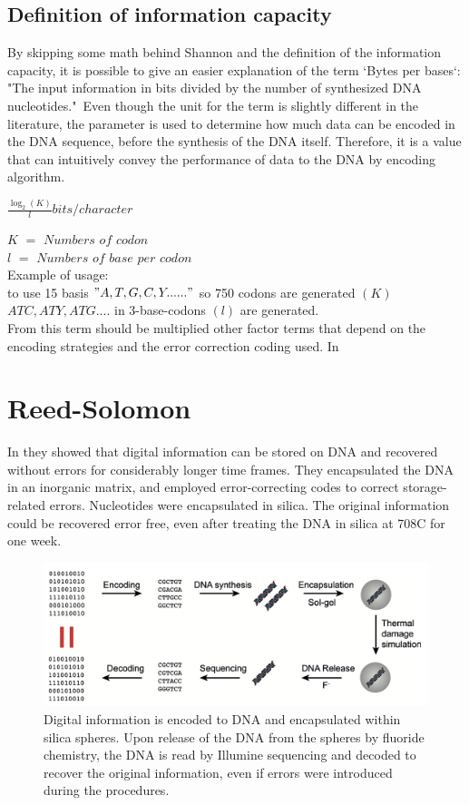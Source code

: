 \documentclass[10pt,twocolumn,twoside]{gsajnl}
\begin{document}
\subsection{Definition of information capacity}
By skipping some math behind Shannon and the definition of the information capacity, it is possible to give an easier explanation of the term ‘Bytes per bases‘: "The input information in bits divided by the number of synthesized DNA nucleotides."\
Even though the unit for the term is slightly different in the literature, the parameter is used to determine how much data can be encoded in the DNA sequence, before the synthesis of the DNA itself. Therefore, it is a value that can intuitively convey the performance of data to the DNA by encoding algorithm.
\begin{center}
    $\frac{\log_{2}(K)}{l} bits/character $
\end{center}
$K$ $=$ $Numbers$ $of$ $codon$\\
$l$ $=$ $Numbers$ $of$ $base$ $per$ $codon$
\\Example of usage:\\
to use 15 basis $"A,T,G,C,Y......"$ so 750 codons are generated $(K)$ $ATC,ATY,ATG ....$ in 3-base-codons $(l)$ are generated.\\
From this term should be multiplied other factor terms that depend on the encoding strategies and the error correction coding used.
In 
\section{Reed-Solomon}
In \cite{grass2015robust} they showed that digital information can be stored on DNA and recovered without errors for considerably longer time frames. They encapsulated the DNA in an inorganic matrix, and employed error-correcting codes to correct storage-related errors. Nucleotides were encapsulated in silica. The original information could be recovered error free, even after treating the DNA in silica at 708C for one week.
\begin{figure}[h!]
    \includegraphics[width=\linewidth]{Figures/Reed-Solomon-Silica.png}
    \caption{Digital information is encoded to DNA and encapsulated within silica spheres. Upon release of the DNA from the spheres by fluoride chemistry, the DNA is read by Illumine sequencing and decoded to recover the original information, even if errors were introduced during the procedures.}
    \centering
    \label{fig:my_label4}
\end{figure}
\end{document}

